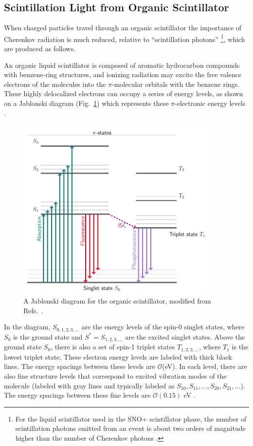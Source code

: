 \subsection{Scintillation Light from Organic Scintillator}\label{sect:scintillator}

When charged particles travel through an organic scintillator the importance of Cherenkov radiation is much reduced, relative to ``scintillation photons'' \footnote{For the liquid scintillator used in the SNO+ scintillator phase, the number of scintillation photons emitted from an event is about two orders of magnitude higher than the number of Cherenkov photons \cite{kaptanoglu2020reactor}.}, which are produced as follows. 

An organic liquid scintillator is composed of aromatic hydrocarbon compounds with benzene-ring structures, and ionizing radiation may excite the free valence electrons of the molecules into the $\pi$-molecular orbitals with the benzene rings. These highly delocalized electrons can occupy a series of energy levels, as shown on a Jablonski diagram (Fig.~\ref{jablonski}) which represents these $\pi$-electronic energy levels \cite{leo2012techniques,knoll2010radiation}. 
\begin{figure}[!htb]
	\centering
	\includegraphics[width=10cm]{jablonski.png}
	\caption[A Jablonski diagram for the organic scintillator.]{A Jablonski diagram for the organic scintillator, modified from Refs.~\cite{ knoll2010radiation,birks1965theory}.}
	\label{jablonski}
\end{figure}
In the diagram, $S_{0,1,2,3,...}$ are the energy levels of the spin-0 singlet states, where $S_0$ is the ground state and $S^*=S_{1,2,3,...}$ are the excited singlet states. Above the ground state $S_0$, there is also a set of spin-1 triplet states $T_{1,2,3,...}$, where $T_1$ is the lowest triplet state. These electron energy levels are labeled with thick black lines. The energy spacings between these levels are $\mathcal{O}$(eV). In each level, there are also fine structure levels that correspond to excited vibration modes of the molecule (labeled with gray lines and typically labeled as $S_{10}, S_{11}, ..., S_{20}, S_{21}, ...$). The energy spacings between these fine levels are $\mathcal{O}(0.15)$ eV \cite{leo2012techniques, knoll2010radiation}.

